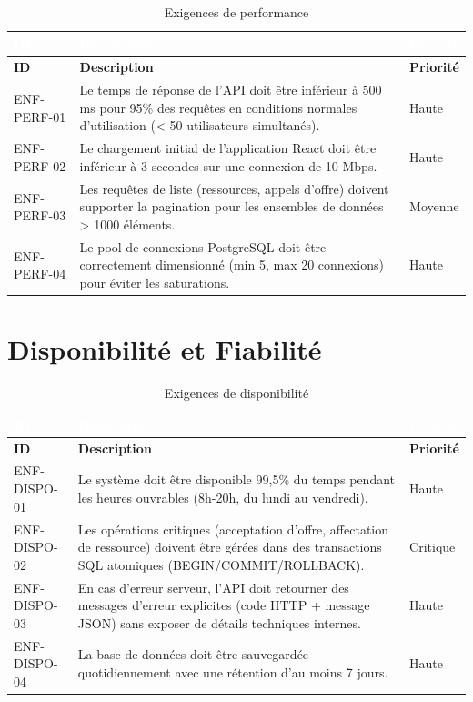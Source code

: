 \documentclass[12pt,a4paper]{report}
\begin{document}
\begin{longtable}{|C{1.8cm}|L{9cm}|C{2cm}|}
\caption{Exigences de performance} \\
\hline
{}\textcolor{white}{\textbf{ID}} & \textcolor{white}{\textbf{Description}} & \textcolor{white}{\textbf{Priorité}} \\
\hline
\endfirsthead
\hline
\textbf{ID} & \textbf{Description} & \textbf{Priorité} \\
\hline
\endhead
ENF-PERF-01 & Le temps de réponse de l'API doit être inférieur à 500 ms pour 95\% des requêtes en conditions normales d'utilisation (< 50 utilisateurs simultanés). & Haute \\
\hline
ENF-PERF-02 & Le chargement initial de l'application React doit être inférieur à 3 secondes sur une connexion de 10 Mbps. & Haute \\
\hline
ENF-PERF-03 & Les requêtes de liste (ressources, appels d'offre) doivent supporter la pagination pour les ensembles de données > 1000 éléments. & Moyenne \\
\hline
ENF-PERF-04 & Le pool de connexions PostgreSQL doit être correctement dimensionné (min 5, max 20 connexions) pour éviter les saturations. & Haute \\
\hline
\end{longtable}

\section{Disponibilité et Fiabilité}

\begin{longtable}{|C{1.8cm}|L{9cm}|C{2cm}|}
\caption{Exigences de disponibilité} \\
\hline
{}\textcolor{white}{\textbf{ID}} & \textcolor{white}{\textbf{Description}} & \textcolor{white}{\textbf{Priorité}} \\
\hline
\endfirsthead
\hline
\textbf{ID} & \textbf{Description} & \textbf{Priorité} \\
\hline
\endhead
ENF-DISPO-01 & Le système doit être disponible 99,5\% du temps pendant les heures ouvrables (8h-20h, du lundi au vendredi). & Haute \\
\hline
ENF-DISPO-02 & Les opérations critiques (acceptation d'offre, affectation de ressource) doivent être gérées dans des transactions SQL atomiques (BEGIN/COMMIT/ROLLBACK). & Critique \\
\hline
ENF-DISPO-03 & En cas d'erreur serveur, l'API doit retourner des messages d'erreur explicites (code HTTP + message JSON) sans exposer de détails techniques internes. & Haute \\
\hline
ENF-DISPO-04 & La base de données doit être sauvegardée quotidiennement avec une rétention d'au moins 7 jours. & Haute \\
\hline
\end{longtable}
\end{document}
